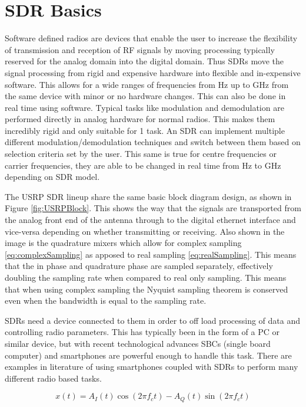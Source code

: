 \section{SDR Basics} \label{sec:SDRBasics}
Software defined radios are devices that enable the user to increase the flexibility of transmission and reception of RF signals by moving processing typically reserved
for the analog domain into the digital domain. Thus SDRs move the signal processing from rigid and expensive hardware into flexible and in-expensive software. This
allows for a wide ranges of frequencies from Hz up to GHz from the same device with minor or no hardware changes. This can also be done in real time using software.
Typical tasks like modulation and demodulation are performed directly in analog hardware for normal radios. This makes them incredibly rigid and only suitable for 1 task.
An SDR can implement multiple different modulation/demodulation techniques and switch between them based on selection criteria set by the user. This same is true for
centre frequencies or carrier frequencies, they are able to be changed in real time from Hz to GHz depending on SDR model.

The USRP SDR lineup share the same basic block diagram design, as shown in Figure \ref{fig:USRPBlock}. This shows the way that the signals are transported from the analog
front end of the antenna through to the digital ethernet interface and vice-versa depending on whether transmitting or receiving. Also shown in the image is the
quadrature mixers which allow for complex sampling \ref{eq:complexSampling} as apposed to real sampling \ref{eq:realSampling}. This means that the in phase and quadrature phase are sampled separately, effectively
doubling the sampling rate when compared to real only sampling. This means that when using complex sampling the Nyquist sampling theorem is conserved even when the
bandwidth is equal to the sampling rate.

SDRs need a device connected to them in order to off load processing of data and controlling radio parameters. This has typically been in the form of a PC or similar
device, but with recent technological advances SBCs (single board computer) and smartphones are powerful enough to handle this task. There are examples in literature of
using smartphones coupled with SDRs to perform many different radio based tasks.

\begin{equation} \label{eq:complexSampling}
    x\left(t\right) = A_{I}\left(t\right)\cos\left(2\pi f_{c}t\right) - A_{Q}\left(t\right)\sin\left(2\pi f_{c}t\right)
\end{equation}


